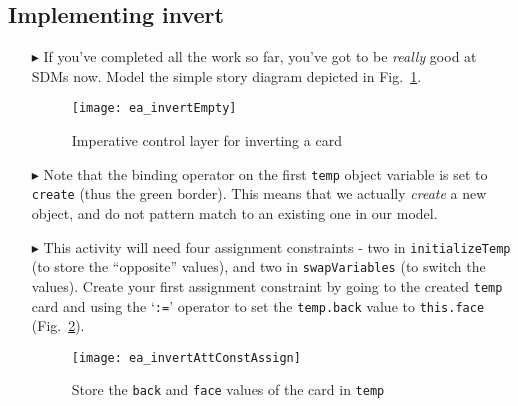\newpage
\hypertarget{invertCard vis}{}
\subsection{Implementing invert}
\visHeader

\begin{itemize}

\vspace{0.5cm}

\item[$\blacktriangleright$] If you've completed all the work so far, you've got to be \emph{really} good at SDMs now. Model the simple story diagram
depicted in Fig.~\ref{ea:sdm_invertEmpty}.

\vspace{0.5cm}

\begin{figure}[htbp]
\begin{center}
  \texttt{[image: ea\_invertEmpty]}
  \caption{Imperative control layer for inverting a card}  
  \label{ea:sdm_invertEmpty}
\end{center}
\end{figure}

\item[$\blacktriangleright$] Note that the binding operator on the first \texttt{temp} object variable is set to \texttt{create} (thus the green
border). This means that we actually \emph{create} a new object, and do not pattern match to an existing one in our model.

\item[$\blacktriangleright$] This activity will need four assignment constraints - two in \texttt{in\-it\-ia\-lize\-Temp} (to store the ``opposite'' values),
and two in \texttt{swapVariables} (to switch the values). Create your first assignment constraint by going to the created \texttt{temp} card and using the
`\texttt{:=}' operator to set the \texttt{temp.back} value to \texttt{this.face} (Fig.~\ref{ea:sdm_invertAssignment}).

\begin{figure}[htbp]
\begin{center}
  \texttt{[image: ea\_invertAttConstAssign]}
  \caption{Store the \texttt{back} and \texttt{face} values of the card in \texttt{temp}}  
  \label{ea:sdm_invertAssignment}
\end{center}
\end{figure}

\clearpage


\end{itemize}
